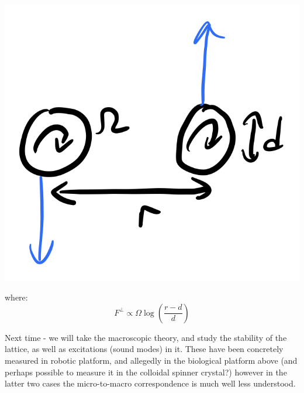 \begin{center}
    \includegraphics[scale=0.35]{Lectures/Images/lec3-lubricationforces.png}
\end{center}

where:
\begin{equation}
    F^\perp \propto \Omega \log\left(\frac{r - d}{d}\right)
\end{equation}

Next time - we will take the macroscopic theory, and study the stability of the lattice, as well as excitations (sound modes) in it. These have been concretely measured in robotic platform, and allegedly in the biological platform above (and perhaps possible to measure it in the colloidal spinner crystal?) however in the latter two cases the micro-to-macro correspondence is much well less understood.